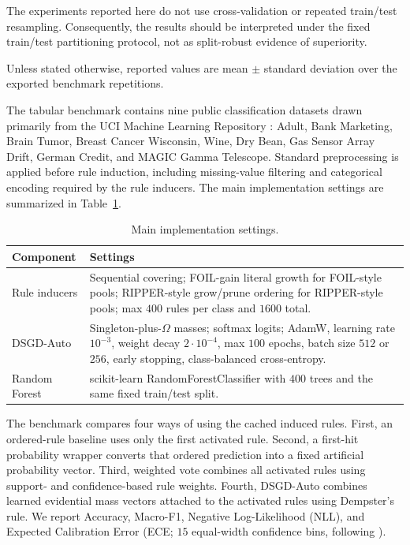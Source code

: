 \documentclass[conference]{IEEEtran}
\renewcommand{\arraystretch}{0.95}
\begin{document}
The experiments reported here do not use cross-validation or repeated train/test resampling. Consequently, the results should be interpreted under the fixed train/test partitioning protocol, not as split-robust evidence of superiority.

Unless stated otherwise, reported values are mean $\pm$ standard deviation over the exported benchmark repetitions.

The tabular benchmark contains nine public classification datasets drawn primarily from the UCI Machine Learning Repository \cite{uci2017}: Adult, Bank Marketing, Brain Tumor, Breast Cancer Wisconsin, Wine, Dry Bean, Gas Sensor Array Drift, German Credit, and MAGIC Gamma Telescope. Standard preprocessing is applied before rule induction, including missing-value filtering and categorical encoding required by the rule inducers. The main implementation settings are summarized in Table~\ref{tab:hyperparams}.

\begin{table}[!t]
  \caption{Main implementation settings.}
  \label{tab:hyperparams}
  \centering
  \scriptsize
  \setlength{\tabcolsep}{2.2pt}
  \renewcommand{\arraystretch}{0.98}
  \begin{tabular}{@{}p{}p{}@{}}
    \toprule
    Component & Settings \\
    \midrule
    Rule inducers & Sequential covering; FOIL-gain literal growth for FOIL-style pools; RIPPER-style grow/prune ordering for RIPPER-style pools; max $400$ rules per class and $1600$ total. \\
    DSGD-Auto & Singleton-plus-$\Omega$ masses; softmax logits; AdamW, learning rate $10^{-3}$, weight decay $2{\cdot}10^{-4}$, max $100$ epochs, batch size $512$ or $256$, early stopping, class-balanced cross-entropy. \\
    Random Forest & scikit-learn RandomForestClassifier with $400$ trees and the same fixed train/test split. \\
    \bottomrule
  \end{tabular}
\end{table}

The benchmark compares four ways of using the cached induced rules. First, an ordered-rule baseline uses only the first activated rule. Second, a first-hit probability wrapper converts that ordered prediction into a fixed artificial probability vector. Third, weighted vote combines all activated rules using support- and confidence-based rule weights. Fourth, DSGD-Auto combines learned evidential mass vectors attached to the activated rules using Dempster's rule. We report Accuracy, Macro-F1, Negative Log-Likelihood (NLL), and Expected Calibration Error (ECE; $15$ equal-width confidence bins, following \cite{guo2017}).
\end{document}
